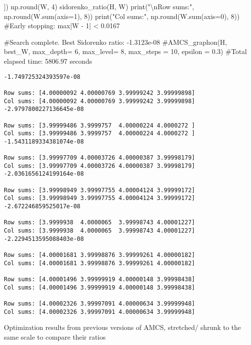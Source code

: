 \documentclass[
  letterpaper,
  DIV=11,
  numbers=noendperiod]{scrartcl}
\newenvironment{Shaded}{\begin{snugshade}}{\end{snugshade}}
\newcommand{\BuiltInTok}[1]{\textcolor[rgb]{0.00,0.23,0.31}{#1}}
\newcommand{\CharTok}[1]{\textcolor[rgb]{0.13,0.47,0.30}{#1}}
\newcommand{\CommentTok}[1]{\textcolor[rgb]{0.37,0.37,0.37}{#1}}
\newcommand{\DecValTok}[1]{\textcolor[rgb]{0.68,0.00,0.00}{#1}}
\newcommand{\NormalTok}[1]{\textcolor[rgb]{0.00,0.23,0.31}{#1}}
\newcommand{\OperatorTok}[1]{\textcolor[rgb]{0.37,0.37,0.37}{#1}}
\newcommand{\StringTok}[1]{\textcolor[rgb]{0.13,0.47,0.30}{#1}}
\begin{document}
\begin{Shaded}
\begin{Highlighting}[]
\NormalTok{])}
\NormalTok{np.}\BuiltInTok{round}\NormalTok{(W, }\DecValTok{4}\NormalTok{)}
\NormalTok{sidorenko\_ratio(H, W)}
\BuiltInTok{print}\NormalTok{(}\StringTok{"}\CharTok{\textbackslash{}n}\StringTok{Row sums:"}\NormalTok{, np.}\BuiltInTok{round}\NormalTok{(W.}\BuiltInTok{sum}\NormalTok{(axis}\OperatorTok{=}\DecValTok{1}\NormalTok{), }\DecValTok{8}\NormalTok{))}
\BuiltInTok{print}\NormalTok{(}\StringTok{"Col sums:"}\NormalTok{, np.}\BuiltInTok{round}\NormalTok{(W.}\BuiltInTok{sum}\NormalTok{(axis}\OperatorTok{=}\DecValTok{0}\NormalTok{), }\DecValTok{8}\NormalTok{))}
\CommentTok{\#Early stopping: max|W {-} 1| \textless{} 0.0167}

\CommentTok{\#Search complete. Best Sidorenko ratio: {-}1.3123e{-}08}
\CommentTok{\#AMCS\_graphon(H, best\_W, max\_depth= 6, max\_level= 8, max\_steps = 10, epsilon = 0.3)}
\CommentTok{\#Total elapsed time: 5806.97 seconds}
\end{Highlighting}
\end{Shaded}

\begin{verbatim}
-1.749725324393597e-08

Row sums: [4.00000092 4.00000769 3.99999242 3.99999898]
Col sums: [4.00000092 4.00000769 3.99999242 3.99999898]
-2.9797800227136645e-08

Row sums: [3.99999486 3.9999757  4.00000224 4.0000272 ]
Col sums: [3.99999486 3.9999757  4.00000224 4.0000272 ]
-1.5431189334381074e-08

Row sums: [3.99997709 4.00003726 4.00000387 3.99998179]
Col sums: [3.99997709 4.00003726 4.00000387 3.99998179]
-2.0361656124199164e-08

Row sums: [3.99998949 3.99997755 4.00004124 3.99999172]
Col sums: [3.99998949 3.99997755 4.00004124 3.99999172]
-2.672246859525017e-08

Row sums: [3.9999938  4.0000065  3.99998743 4.00001227]
Col sums: [3.9999938  4.0000065  3.99998743 4.00001227]
-2.2294513595088403e-08

Row sums: [4.00001681 3.99998876 3.99999261 4.00000182]
Col sums: [4.00001681 3.99998876 3.99999261 4.00000182]

Row sums: [4.00001496 3.99999919 4.00000148 3.99998438]
Col sums: [4.00001496 3.99999919 4.00000148 3.99998438]

Row sums: [4.00002326 3.99997091 4.00000634 3.99999948]
Col sums: [4.00002326 3.99997091 4.00000634 3.99999948]
\end{verbatim}

Optimization results from previous versions of AMCS, stretched/ shrunk
to the same scale to compare their ratios
\end{document}
